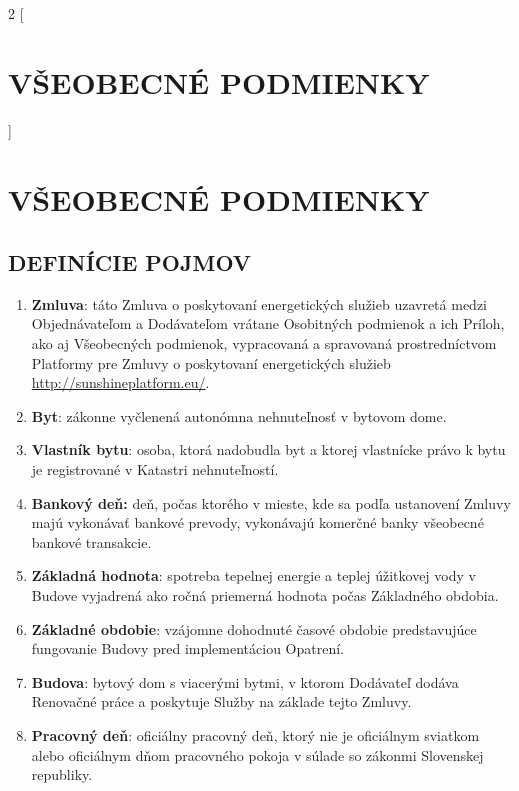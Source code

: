 \begin{multicols}{2}
[\section{VŠEOBECNÉ PODMIENKY}]
\section{VŠEOBECNÉ PODMIENKY}

\subsection{DEFINÍCIE POJMOV}
\begin{enumerate}


\item\textbf{Zmluva}: táto Zmluva o poskytovaní energetických služieb
uzavretá medzi Objednávateľom a Dodávateľom vrátane Osobitných podmienok
a ich Príloh, ako aj Všeobecných podmienok, vypracovaná a spravovaná
prostredníctvom Platformy pre Zmluvy o poskytovaní energetických služieb
\href{http://www.sharex.lv}{http://sunshineplatform.eu/}.

\item\textbf{Byt}: zákonne vyčlenená autonómna nehnuteľnosť v bytovom dome.

\item\textbf{Vlastník bytu}: osoba, ktorá nadobudla byt a ktorej vlastnícke
právo k bytu je registrované v Katastri nehnuteľností.

\item\textbf{Bankový deň:} deň, počas ktorého v mieste, kde sa podľa
ustanovení Zmluvy majú vykonávať bankové prevody, vykonávajú komerčné
banky všeobecné bankové transakcie.

\item\textbf{Základná hodnota}: spotreba tepelnej energie a teplej úžitkovej
vody v Budove vyjadrená ako ročná priemerná hodnota počas Základného
obdobia.

\item\textbf{Základné obdobie}: vzájomne dohodnuté časové obdobie
predstavujúce fungovanie Budovy pred implementáciou Opatrení.

\item\textbf{Budova}: bytový dom s viacerými bytmi, v ktorom Dodávateľ dodáva
Renovačné práce a poskytuje Služby na základe tejto Zmluvy.

\item\textbf{Pracovný deň}: oficiálny pracovný deň, ktorý nie je oficiálnym
sviatkom alebo oficiálnym dňom pracovného pokoja v súlade so zákonmi
Slovenskej republiky.


\end{enumerate}
\end{multicols}
